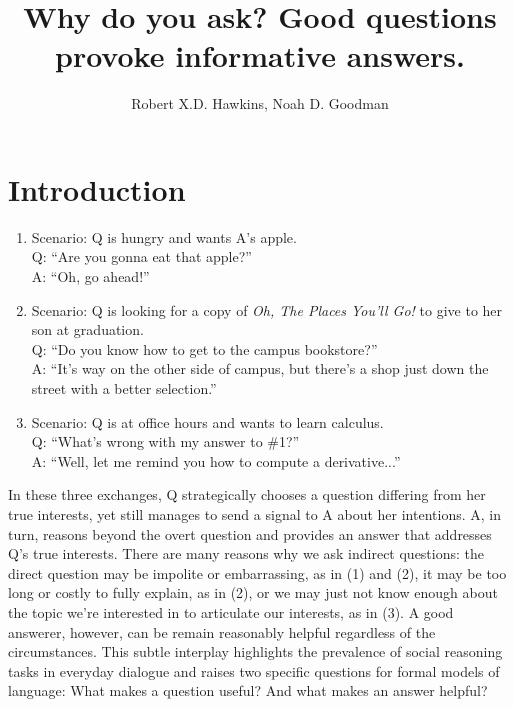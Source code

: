 \documentclass[12pt, floatsintext, jou]{apa6}
\title{Why do you ask? Good questions provoke informative answers.}
\author{Robert X.D. Hawkins, Noah D. Goodman}
\affiliation{Stanford University}
\begin{document}
\maketitle
\section{Introduction}

\begin{enumerate}[(1)]
\item Scenario: Q is hungry and wants A's apple.\\Q: ``Are you gonna eat that apple?''\\ A: ``Oh, go ahead!''
\item Scenario: Q is looking for a copy of \emph{Oh, The Places You'll Go!} to give to her son at graduation.\\ Q: ``Do you know how to get to the campus bookstore?''\\ A: ``It's way on the other side of campus, but there's a shop just down the street with a better selection.''
\item Scenario: Q is at office hours and wants to learn calculus.\\ Q: ``What's wrong with my answer to \#1?''\\ A: ``Well, let me remind you how to compute a derivative...''
\end{enumerate}

In these three exchanges, Q strategically chooses a question differing from her true interests, yet still manages to send a signal to A about her intentions. A, in turn, reasons beyond the overt question and provides an answer that addresses Q's true interests. There are many reasons why we ask indirect questions: the direct question may be impolite or embarrassing, as in (1) and (2), it may be too long or costly to fully explain, as in (2), or we may just not know enough about the topic we're interested in to articulate our interests, as in (3). A good answerer, however, can be remain reasonably helpful regardless of the circumstances. This subtle interplay highlights the prevalence of social reasoning tasks in everyday dialogue and raises two specific questions for formal models of language: What makes a question useful? And what makes an answer helpful? 
\end{document}
